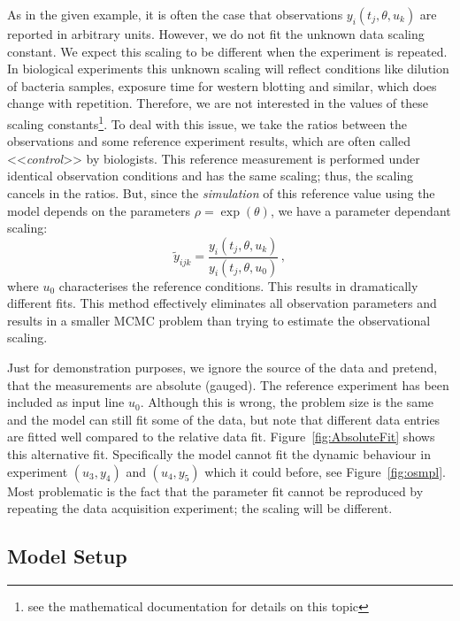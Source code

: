 \documentclass[english]{scrartcl}
\begin{document}
As in the given example, it is often the case that observations
$y_i(t_j,\theta,u_k)$ are reported in arbitrary units. However, we do
not fit the unknown data scaling constant. We expect this scaling to
be different when the experiment is repeated. In biological
experiments this unknown scaling will reflect conditions like dilution
of bacteria samples, exposure time for western blotting and similar,
which does change with repetition. Therefore, we are not interested in
the values of these scaling constants\footnote{see the mathematical
  documentation for details on this topic}. To deal with this issue,
we take the ratios between the observations and some reference
experiment results, which are often called <<\emph{control}>> by
biologists. This reference measurement is performed under identical
observation conditions and has the same scaling; thus, the scaling
cancels in the ratios. But, since the \emph{simulation} of this
reference value using the model depends on the parameters
$\rho=\exp(\theta)$, we have a parameter dependant scaling:
\begin{equation}
  \tilde y_{ijk}=\frac{y_i(t_j,\theta,u_k)}{y_i(t_j,\theta,u_0)}\,,
\end{equation}
where $u_0$ characterises the reference conditions. This results in
dramatically different fits. This method effectively eliminates all
observation parameters and results in a smaller MCMC problem than
trying to estimate the observational scaling.

Just for demonstration purposes, we ignore the source of the data and
pretend, that the measurements are absolute (gauged). The reference
experiment has been included as input line $u_0$. Although this is
wrong, the problem size is the same and the model can still fit some
of the data, but note that different data entries are fitted well
compared to the relative data fit. Figure~\ref{fig:AbsoluteFit} shows
this alternative fit. Specifically the model cannot fit the dynamic
behaviour in experiment $(u_3,y_4)$ and $(u_4,y_5)$ which it could
before, see Figure~\ref{fig:osmpl}. Most problematic is the fact that
the parameter fit cannot be reproduced by repeating the data
acquisition experiment; the scaling will be different.

\subsection{Model Setup}
\label{sec:model}

\end{document}
